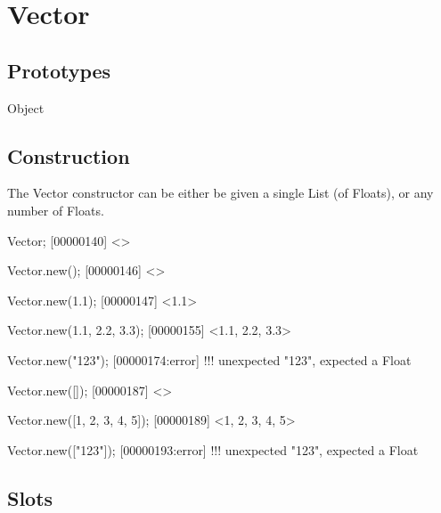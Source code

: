 
\section{Vector}

\subsection{Prototypes}
\begin{refObjects}
\item[Object]
\end{refObjects}

\subsection{Construction}

The Vector constructor can be either be given a single List (of Floats), or
any number of Floats.

\begin{urbiscript}
Vector;
[00000140] <>

Vector.new();
[00000146] <>

Vector.new(1.1);
[00000147] <1.1>

Vector.new(1.1, 2.2, 3.3);
[00000155] <1.1, 2.2, 3.3>

Vector.new("123");
[00000174:error] !!! unexpected "123", expected a Float

Vector.new([]);
[00000187] <>

Vector.new([1, 2, 3, 4, 5]);
[00000189] <1, 2, 3, 4, 5>

Vector.new(["123"]);
[00000193:error] !!! unexpected "123", expected a Float
\end{urbiscript}

\subsection{Slots}

